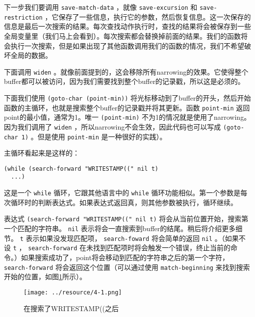 下一步我们要调用 \texttt{save-match-data} ，就像 \texttt{save-excursion} 和 \texttt{save-restriction} ，它保存了一些信息，执行它的参数，然后恢复信息。这一次保存的信息是最后一次搜索的结果。每次查找动作执行时，查找的结果将会被保存到一些全局变量里（我们马上会看到）。每次搜索都会替换掉前面的结果。我们的函数将会执行一次搜索，但是如果出现了其他函数调用我们的函数的情况，我们不希望破坏全局的数据。

下面调用 \texttt{widen} 。就像前面提到的，这会移除所有narrowing的效果。它使得整个buffer都可以被访问，因为我们需要找到整个buffer的记录戳，所以这是必须的。

下面我们使用 \texttt{(goto-char (point-min))} 将光标移动到了buffer的开头，然后开始函数的主循环，也就是搜索整个buffer的记录戳并将其更新。函数 \texttt{point-min} 返回point的最小值，通常为1。唯一 \texttt{(point-min)} 不为1的情况就是使用了narrowing。因为我们调用了 \texttt{widen} ，所以narrowing不会生效，因此代码也可以写成 \texttt{(goto-char 1)} 。但是使用 \texttt{point-min} 是一种很好的实践）。

主循环看起来是这样的：

\begin{verbatim}
(while (search-forward "WRITESTAMP((" nil t)
  ...)
\end{verbatim}

这是一个 \texttt{while} 循环，它跟其他语言中的 \texttt{while} 循环功能相似。第一个参数是每次循环时的判断表达式。如果表达式返回真，则其他参数被执行，循环继续。

表达式 \texttt{(search-forward "WRITESTAMP((" nil t)} 将会从当前位置开始，搜索第一个匹配的字符串。 \texttt{nil} 表示将会一直搜索到buffer的结尾。稍后将介绍更多细节。 \texttt{t} 表示如果没发现匹配项， \texttt{search-foward} 将会简单的返回 \texttt{nil} 。（如果不设 \texttt{t} ， \texttt{search-forward} 在未找到匹配项时将会触发一个错误，终止当前的命令。）如果搜索成功了，point将会移动到匹配的字符串之后的第一个字符， \texttt{search-forward} 将会返回这个位置（可以通过使用 \texttt{match-beginning} 来找到搜索开始的位置，如图\ref{figure:after-searching-for-the-string-WRITESTAMP((}所示）。

\begin{figure}[hbt!]
  \texttt{[image: ../resource/4-1.png]}
  \caption{在搜索了WRITESTAMP((之后}
  \label{figure:after-searching-for-the-string-WRITESTAMP((}
\end{figure}

